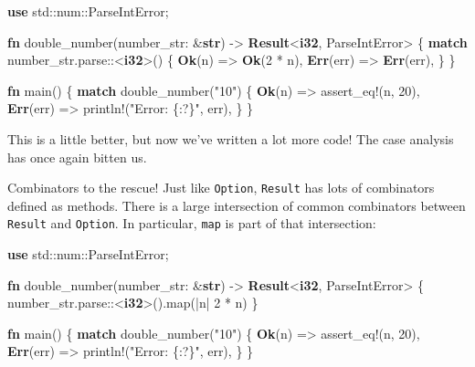 \documentclass[a4paper,]{book}
\newenvironment{Shaded}{\begin{snugshade}}{\end{snugshade}}
\newcommand{\KeywordTok}[1]{\textcolor[rgb]{0.13,0.29,0.53}{\textbf{{#1}}}}
\newcommand{\DecValTok}[1]{\textcolor[rgb]{0.00,0.00,0.81}{{#1}}}
\newcommand{\StringTok}[1]{\textcolor[rgb]{0.31,0.60,0.02}{{#1}}}
\newcommand{\OtherTok}[1]{\textcolor[rgb]{0.56,0.35,0.01}{{#1}}}
\newcommand{\NormalTok}[1]{{#1}}
\begin{document}
\begin{Shaded}
\begin{Highlighting}[]
\KeywordTok{use} \NormalTok{std::num::ParseIntError;}

\KeywordTok{fn} \NormalTok{double_number(number_str: &}\KeywordTok{str}\NormalTok{) -> }\KeywordTok{Result}\NormalTok{<}\KeywordTok{i32}\NormalTok{, ParseIntError> \{}
    \KeywordTok{match} \NormalTok{number_str.parse::<}\KeywordTok{i32}\NormalTok{>() \{}
        \KeywordTok{Ok}\NormalTok{(n) => }\KeywordTok{Ok}\NormalTok{(}\DecValTok{2} \NormalTok{* n),}
        \KeywordTok{Err}\NormalTok{(err) => }\KeywordTok{Err}\NormalTok{(err),}
    \NormalTok{\}}
\NormalTok{\}}

\KeywordTok{fn} \NormalTok{main() \{}
    \KeywordTok{match} \NormalTok{double_number(}\StringTok{"10"}\NormalTok{) \{}
        \KeywordTok{Ok}\NormalTok{(n) => }\OtherTok{assert_eq!}\NormalTok{(n, }\DecValTok{20}\NormalTok{),}
        \KeywordTok{Err}\NormalTok{(err) => }\OtherTok{println!}\NormalTok{(}\StringTok{"Error: \{:?\}"}\NormalTok{, err),}
    \NormalTok{\}}
\NormalTok{\}}
\end{Highlighting}
\end{Shaded}

This is a little better, but now we've written a lot more code! The case
analysis has once again bitten us.

Combinators to the rescue! Just like \texttt{Option}, \texttt{Result}
has lots of combinators defined as methods. There is a large
intersection of common combinators between \texttt{Result} and
\texttt{Option}. In particular, \texttt{map} is part of that
intersection:

\begin{Shaded}
\begin{Highlighting}[]
\KeywordTok{use} \NormalTok{std::num::ParseIntError;}

\KeywordTok{fn} \NormalTok{double_number(number_str: &}\KeywordTok{str}\NormalTok{) -> }\KeywordTok{Result}\NormalTok{<}\KeywordTok{i32}\NormalTok{, ParseIntError> \{}
    \NormalTok{number_str.parse::<}\KeywordTok{i32}\NormalTok{>().map(|n| }\DecValTok{2} \NormalTok{* n)}
\NormalTok{\}}

\KeywordTok{fn} \NormalTok{main() \{}
    \KeywordTok{match} \NormalTok{double_number(}\StringTok{"10"}\NormalTok{) \{}
        \KeywordTok{Ok}\NormalTok{(n) => }\OtherTok{assert_eq!}\NormalTok{(n, }\DecValTok{20}\NormalTok{),}
        \KeywordTok{Err}\NormalTok{(err) => }\OtherTok{println!}\NormalTok{(}\StringTok{"Error: \{:?\}"}\NormalTok{, err),}
    \NormalTok{\}}
\NormalTok{\}}
\end{Highlighting}
\end{Shaded}
\end{document}
